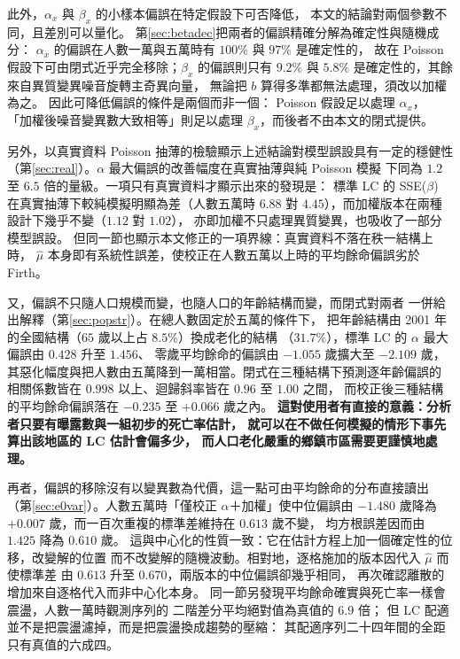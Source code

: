 \documentclass[UTF8, fontset=macnew, a4paper, 12pt]{ctexart}
\begin{document}
此外，$\alpha_x$ 與 $\beta_x$ 的小樣本偏誤在特定假設下可否降低，
本文的結論對兩個參數不同，且差別可以量化。
第\ref{sec:betadec}把兩者的偏誤精確分解為確定性與隨機成分：
$\alpha_x$ 的偏誤在人數一萬與五萬時有 $100\%$ 與 $97\%$ 是確定性的，
故在 Poisson 假設下可由閉式近乎完全移除；$\beta_x$ 的偏誤則只有
$9.2\%$ 與 $5.8\%$ 是確定性的，其餘來自異質變異噪音旋轉主奇異向量，
無論把 $b$ 算得多準都無法處理，須改以加權為之。
因此可降低偏誤的條件是兩個而非一個： Poisson 假設足以處理 $\alpha_x$，
「加權後噪音變異數大致相等」則足以處理 $\beta_x$，而後者不由本文的閉式提供。

另外，以真實資料 Poisson 抽薄的檢驗顯示上述結論對模型誤設具有一定的穩健性
（第\ref{sec:real}）。$\alpha$ 最大偏誤的改善幅度在真實抽薄與純 Poisson 模擬
下同為 $1.2$ 至 $6.5$ 倍的量級。一項只有真實資料才顯示出來的發現是：
標準 LC 的 SSE($\beta$) 在真實抽薄下較純模擬明顯為差（人數五萬時 $6.88$
對 $4.45$），而加權版本在兩種設計下幾乎不變（$1.12$ 對 $1.02$），
亦即加權不只處理異質變異，也吸收了一部分模型誤設。
但同一節也顯示本文修正的一項界線：真實資料不落在秩一結構上時，
$\hat\mu$ 本身即有系統性誤差，使校正在人數五萬以上時的平均餘命偏誤劣於
Firth。

又，偏誤不只隨人口規模而變，也隨人口的年齡結構而變，而閉式對兩者
一併給出解釋（第\ref{sec:popstr}）。在總人數固定於五萬的條件下，
把年齡結構由 2001 年的全國結構（$65$ 歲以上占 $8.5\%$）換成老化的結構
（$31.7\%$），標準 LC 的 $\alpha$ 最大偏誤由 $0.428$ 升至 $1.456$、
零歲平均餘命的偏誤由 $-1.055$ 歲擴大至 $-2.109$ 歲，
其惡化幅度與把人數由五萬降到一萬相當。閉式在三種結構下預測逐年齡偏誤的
相關係數皆在 $0.998$ 以上、迴歸斜率皆在 $0.96$ 至 $1.00$ 之間，
而校正後三種結構的平均餘命偏誤落在 $-0.235$ 至 $+0.066$ 歲之內。
\textbf{這對使用者有直接的意義：分析者只要有曝露數與一組初步的死亡率估計，
就可以在不做任何模擬的情形下事先算出該地區的 LC 估計會偏多少，
而人口老化嚴重的鄉鎮市區需要更謹慎地處理。}

再者，偏誤的移除沒有以變異數為代價，這一點可由平均餘命的分布直接讀出
（第\ref{sec:e0var}）。人數五萬時「僅校正 $\alpha$＋加權」使中位偏誤由
$-1.480$ 歲降為 $+0.007$ 歲，而一百次重複的標準差維持在 $0.613$ 歲不變，
均方根誤差因而由 $1.425$ 降為 $0.610$ 歲。
這與中心化的性質一致：它在估計方程上加一個確定性的位移，改變解的位置
而不改變解的隨機波動。相對地，逐格施加的版本因代入 $\hat\mu$ 而使標準差
由 $0.613$ 升至 $0.670$，兩版本的中位偏誤卻幾乎相同，
再次確認離散的增加來自逐格代入而非中心化本身。
同一節另發現平均餘命確實與死亡率一樣會震盪，人數一萬時觀測序列的
二階差分平均絕對值為真值的 $6.9$ 倍；
但 LC 配適並不是把震盪濾掉，而是把震盪換成趨勢的壓縮：
其配適序列二十四年間的全距只有真值的六成四。
\end{document}
